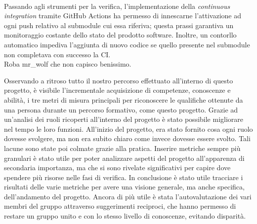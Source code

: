 	\\Passando agli strumenti per la verifica, l'implementazione della \textit{continuous integration} tramite GitHub Actions ha permesso di innescarne l'attivazione ad ogni push relativo al submodule cui essa riferiva; questa prassi garantiva un monitoraggio costante dello stato del prodotto software. Inoltre, un contorllo automatico impediva l'aggiunta di nuovo codice se quello presente nel submodule non completava con successo la CI.
	\\Roba mr_wolf che non capisco benissimo.
	
	
	\newline\newline
	Osservando a ritroso tutto il nostro percorso effettuato all’interno di questo progetto, è visibile l’incrementale acquisizione di competenze, conoscenze e abilità, i tre metri di misura principali per riconoscere le qualifiche ottenute da una persona durante un percorso formativo, come questo progetto.
	\newline
	Grazie ad un'analisi dei ruoli ricoperti all’interno del progetto è stato possibile migliorare nel tempo le loro funzioni. All’inizio del progetto, era stato fornito cosa ogni ruolo dovesse svolgere, ma non era subito chiaro come invece dovesse essere svolto. Tali lacune sono state poi colmate grazie alla pratica.
	\newline
	Inserire metriche sempre più granulari è stato utile per poter analizzare aspetti del progetto all’apparenza di secondaria importanza, ma che si sono rivelate significativi per capire dove spendere più risorse nelle fasi di verifica.
	\newline
	In conclusione è stato utile tracciare i risultati delle varie metriche per avere una visione generale, ma anche specifica, dell’andamento del progetto. Ancora di più utile è stata l’autovalutazione dei vari membri del gruppo attraverso suggerimenti reciproci, che hanno permesso di restare un gruppo unito e con lo stesso livello di conoscenze, evitando disparità.
